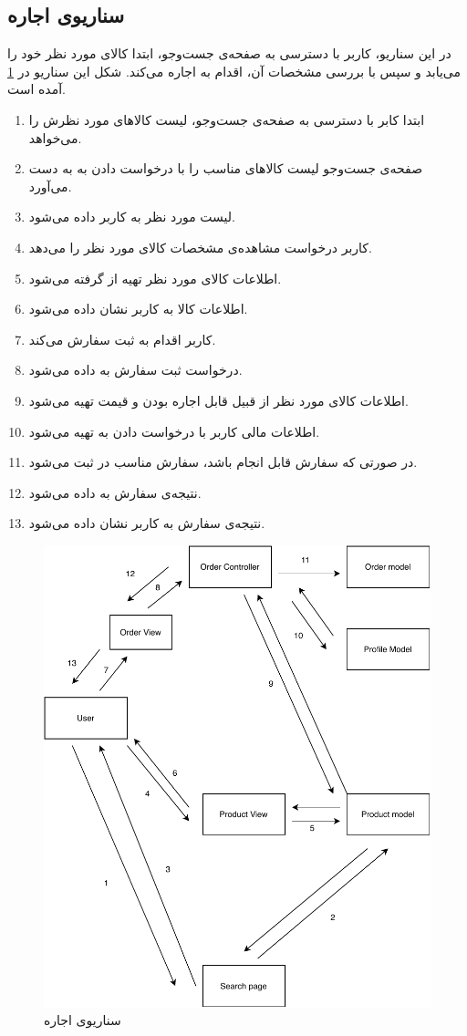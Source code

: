 \subsection*{سناریو‌ی اجاره}
در این سناریو، کاربر با دسترسی به صفحه‌ی جست‌و‌جو، ابتدا کالای مورد نظر خود را می‌یابد و سپس با بررسی مشخصات آن، اقدام به اجاره می‌کند. شکل این سناریو در 
\ref{figscen:2}
آمده است.
\begin{enumerate}
	\item 
	ابتدا کابر با دسترسی به صفحه‌ی جست‌وجو، لیست کالاهای مورد نظرش را می‌خواهد.
	\item 
	صفحه‌ی جست‌و‌جو لیست کالاهای مناسب را با درخواست دادن به 
	به دست می‌آورد.
	\item 
	لیست مورد نظر به کاربر داده می‌شود.
	\item 
کاربر درخواست مشاهده‌ی مشخصات کالای مورد نظر را می‌دهد.
\item 
اطلاعات کالای مورد نظر تهیه از 
گرفته می‌شود.
\item 
اطلاعات کالا به کاربر نشان داده می‌شود.
\item
کاربر اقدام به ثبت سفارش می‌کند.
\item 
درخواست ثبت سفارش به 
داده می‌شود.
\item 
اطلاعات کالای مورد نظر از قبیل قابل اجاره بودن و قیمت تهیه می‌شود.
\item 
اطلاعات مالی کاربر با درخواست دادن به 
تهیه می‌شود.
\item 
در صورتی که سفارش قابل انجام باشد، سفارش مناسب در 
ثبت می‌شود.
\item 
نتیجه‌ی سفارش به 
داده می‌شود.
\item 
نتیجه‌ی سفارش به کاربر نشان داده می‌شود.
\end{enumerate}
\begin{figure}[H]
	\centering
	\includegraphics[width=\textwidth]{diagrams/Order.pdf}
	\caption{سناریو‌ی اجاره ‌ }
	\label{figscen:2}	
\end{figure}